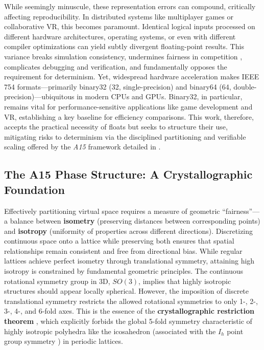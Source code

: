 \documentclass[10pt]{article}
\def\AAAB{\textit{A15}}
\begin{document}
While seemingly minuscule, these representation errors can compound, critically affecting reproducibility. In distributed systems like multiplayer games or collaborative VR, this becomes paramount. Identical logical inputs processed on different hardware architectures, operating systems, or even with different compiler optimizations can yield subtly divergent floating-point results. This variance breaks simulation consistency, undermines fairness in competition \cite{Claypool2006}, complicates debugging and verification, and fundamentally opposes the requirement for determinism. Yet, widespread hardware acceleration makes IEEE 754 formats---primarily binary32 (\SI{32}{\bit}, single-precision) and binary64 (\SI{64}{\bit}, double-precision)---ubiquitous in modern CPUs and GPUs. Binary32, in particular, remains vital for performance-sensitive applications like game development and VR, establishing a key baseline for efficiency comparisons. This work, therefore, accepts the practical necessity of floats but seeks to structure their use, mitigating risks to determinism via the disciplined partitioning and verifiable scaling offered by the \AAAB{} framework detailed in .

\subsection{The A15 Phase Structure: A Crystallographic Foundation}\label{subsec:intro-a15}

Effectively partitioning virtual space requires a measure of geometric ``fairness''—a balance between \textbf{isometry} (preserving distances between corresponding points) and \textbf{isotropy} (uniformity of properties across different directions). Discretizing continuous space onto a lattice while preserving both ensures that spatial relationships remain consistent and free from directional bias. While regular lattices achieve perfect isometry through translational symmetry, attaining high isotropy is constrained by fundamental geometric principles. The continuous rotational symmetry group in 3D, $SO(3)$, implies that highly isotropic structures should appear locally spherical. However, the imposition of discrete translational symmetry restricts the allowed rotational symmetries to only 1-, 2-, 3-, 4-, and 6-fold axes. This is the essence of the \textbf{crystallographic restriction theorem} \cite{AshcroftMermin1976}, which explicitly forbids the global 5-fold symmetry characteristic of highly isotropic polyhedra like the icosahedron (associated with the $I_h$ point group symmetry \cite{Coxeter1973}) in periodic lattices.
\end{document}
